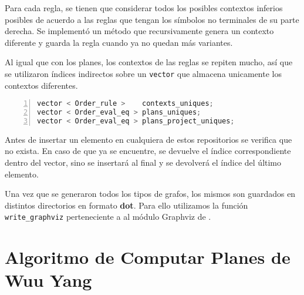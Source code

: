 Para cada regla, se tienen que considerar todos los posibles contextos inferios posibles de acuerdo a las reglas que tengan los símbolos no terminales de su parte derecha. Se implementó un método que recursivamente genera un contexto diferente y guarda la regla cuando ya no quedan más variantes.

Al igual que con los planes, los contextos de las reglas se repiten mucho, así que se utilizaron índices indirectos sobre un \texttt{vector} que almacena unicamente los contextos diferentes.

\begin{lstlisting}[language=C++, basicstyle=\scriptsize, numbers=left, numbersep=5pt, numberstyle=\tiny]
vector < Order_rule >    contexts_uniques;
vector < Order_eval_eq > plans_uniques;
vector < Order_eval_eq > plans_project_uniques;
\end{lstlisting}

Antes de insertar un elemento en cualquiera de estos repositorios se verifica que no exista. En caso de que ya se encuentre, se devuelve el índice correspondiente dentro del vector, sino se insertará al final y se devolverá el índice del último elemento.

Una vez que se generaron todos los tipos de grafos, los mismos son guardados en distintos directorios en formato \textbf{dot}\cite{dot}. Para ello utilizamos la función \texttt{write\_graphviz} perteneciente a al módulo Graphviz de \boost.


\section{Algoritmo de Computar Planes de Wuu Yang}

